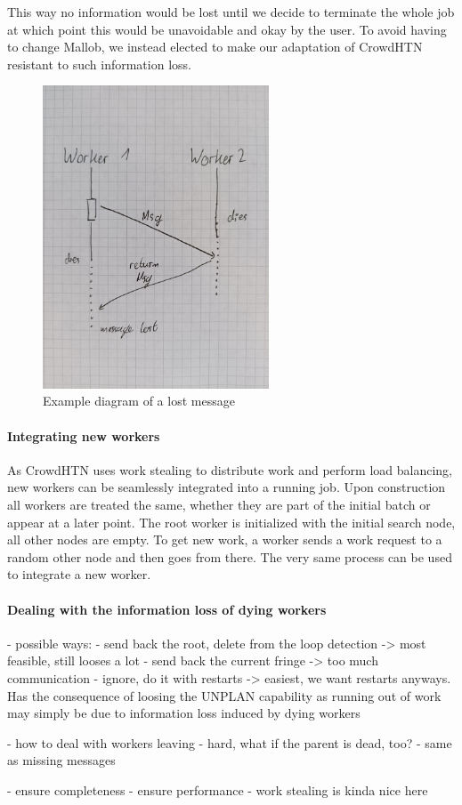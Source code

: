 This way no information would be lost until we decide to terminate the whole job at which point this would be unavoidable and okay by the user. To avoid having to change Mallob, we instead elected to make our adaptation of CrowdHTN resistant to such information loss.
\begin{figure}
	\includegraphics[width=0.6\textwidth]{images/prelim/malleable_lost_message}
	\caption{Example diagram of a lost message}
	\label{malleable: lost message}
\end{figure}

\paragraph{Integrating new workers}
As CrowdHTN uses work stealing to distribute work and perform load balancing, new workers can be seamlessly integrated into a running job. Upon construction all workers are treated the same, whether they are part of the initial batch or appear at a later point. The root worker is initialized with the initial search node, all other nodes are empty. To get new work, a worker sends a work request to a random other node and then goes from there. The very same process can be used to integrate a new worker.

\paragraph{Dealing with the information loss of dying workers}
- possible ways:
	- send back the root, delete from the loop detection -> most feasible, still looses a lot
	- send back the current fringe -> too much communication
	- ignore, do it with restarts -> easiest, we want restarts anyways. Has the consequence of loosing the UNPLAN capability as running out of work may simply be due to information loss induced by dying workers

- how to deal with workers leaving
	- hard, what if the parent is dead, too?
	- same as missing messages

- ensure completeness
- ensure performance
- work stealing is kinda nice here
